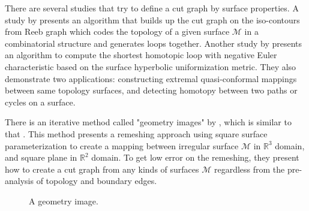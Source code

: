 \documentclass[a4paper,twoside]{article}
\begin{document}
There are several studies that try to define a cut graph by surface properties. A study by \cite{Patane:2007:FCB:1224804.1224947} presents an algorithm that builds up the cut graph on the iso-contours from Reeb graph which codes the topology of a given surface $\mathscr{M}$ in a combinatorial structure and generates loops together. Another study by \cite{Jin:2013:CSH:2396897.2396971} presents an algorithm to compute the shortest homotopic loop with negative Euler characteristic based on the surface hyperbolic uniformization metric. They also demonstrate two applications: constructing extremal quasi-conformal mappings between same topology surfaces, and detecting homotopy between two paths or cycles on a surface. 

There is an iterative method called "geometry images" by \cite{Gu:2002:GI:566654.566589}, which is similar to that \cite{Dey:1994:NTC:177424.178001}. This method presents a remeshing approach using square surface parameterization to create a mapping between irregular surface $\mathscr{M}$ in $\mathbb{R}^3$ domain, and square plane in $\mathbb{R}^2$ domain. To get low error on the remeshing, they present how to create a cut graph from any kinds of surfaces $\mathscr{M}$ regardless from the pre-analysis of topology and boundary edges.

\begin{figure}[!h]
	\centering
	\hspace{10pt}
	
	\caption{A geometry image.}
	\label{fig:gim figure}
\end{figure}
\end{document}
